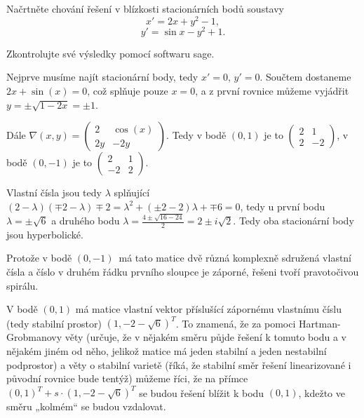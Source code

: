 \documentclass[12pt]{article}					%
\begin{document}
\begin{priklad}
	Načrtněte chování řešení v blízkosti stacionárních bodů soustavy
	$$ x' = 2x + y^2 - 1, $$
	$$ y' = \sin x - y^2 + 1. $$
	
	Zkontrolujte své výsledky pomocí softwaru sage.

	\begin{reseni}
		Nejprve musíme najít stacionární body, tedy $x' = 0$, $y' = 0$. Součtem dostaneme $2x + \sin(x) = 0$, což splňuje pouze $x = 0$, a z první rovnice můžeme vyjádřit $y = ± \sqrt{1 - 2x} = ±1$.

		Dále $\nabla (x, y) = \begin{pmatrix} 2 & \cos(x) \\ 2y & -2y \end{pmatrix}$. Tedy v bodě $(0, 1)$ je to $\begin{pmatrix} 2 & 1 \\ 2 & -2 \end{pmatrix}$, v bodě $(0, -1)$ je to $\begin{pmatrix} 2 & 1 \\ -2 & 2 \end{pmatrix}$.

		Vlastní čísla jsou tedy $\lambda$ splňující $(2 - \lambda)(\mp 2 - \lambda) \mp 2 = \lambda^2 + (\pm 2 - 2)\lambda + \mp 6 = 0$, tedy u první bodu $\lambda = ±\sqrt{6}$ a druhého bodu $\lambda = \frac{4 ± \sqrt{16 - 24}}{2} = 2 ± i\sqrt{2}$. Tedy oba stacionární body jsou hyperbolické.

		Protože v bodě $(0, -1)$ má tato matice dvě různá komplexně sdružená vlastní čísla a číslo v druhém řádku prvního sloupce je záporné, řešeni tvoří pravotočivou spirálu.

		V bodě $(0, 1)$ má matice vlastní vektor příslušící zápornému vlastnímu číslu (tedy stabilní prostor) $(1, -2-\sqrt{6})^T$. To znamená, že za pomoci Hartman-Grobmanovy věty (určuje, že v nějakém směru půjde řešení k tomuto bodu a v nějakém jiném od něho, jelikož matice má jeden stabilní a jeden nestabilní podprostor) a věty o stabilní varietě (říká, že stabilní směr řešení linearizované i původní rovnice bude tentýž) můžeme říci, že na přímce $(0, 1)^T + s·(1, -2-\sqrt{6})^T$ se budou řešení blížit k bodu $(0, 1)$, kdežto ve směru „kolmém“ se budou vzdalovat.


\end{reseni}
\end{priklad}
\end{document}
